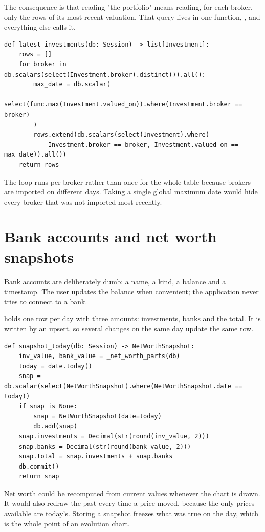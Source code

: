 The consequence is that reading "the portfolio" means reading, for each broker,
only the rows of its most recent valuation. That query lives in one function,
, and everything else calls it.

\begin{lstlisting}[style=py]
def latest_investments(db: Session) -> list[Investment]:
    rows = []
    for broker in db.scalars(select(Investment.broker).distinct()).all():
        max_date = db.scalar(
            select(func.max(Investment.valued_on)).where(Investment.broker == broker)
        )
        rows.extend(db.scalars(select(Investment).where(
            Investment.broker == broker, Investment.valued_on == max_date)).all())
    return rows
\end{lstlisting}

The loop runs per broker rather than once for the whole table because brokers
are imported on different days. Taking a single global maximum date would hide
every broker that was not imported most recently.

\section{Bank accounts and net worth snapshots}

Bank accounts are deliberately dumb: a name, a kind, a balance and a timestamp.
The user updates the balance when convenient; the application never tries to
connect to a bank.

 holds one row per day with three amounts:
investments, banks and the total. It is written by an upsert, so several changes
on the same day update the same row.

\begin{lstlisting}[style=py]
def snapshot_today(db: Session) -> NetWorthSnapshot:
    inv_value, bank_value = _net_worth_parts(db)
    today = date.today()
    snap = db.scalar(select(NetWorthSnapshot).where(NetWorthSnapshot.date == today))
    if snap is None:
        snap = NetWorthSnapshot(date=today)
        db.add(snap)
    snap.investments = Decimal(str(round(inv_value, 2)))
    snap.banks = Decimal(str(round(bank_value, 2)))
    snap.total = snap.investments + snap.banks
    db.commit()
    return snap
\end{lstlisting}

\begin{keypoint}
Net worth could be recomputed from current values whenever the chart is drawn.
It would also redraw the past every time a price moved, because the only prices
available are today's. Storing a snapshot freezes what was true on the day, which
is the whole point of an evolution chart.
\end{keypoint}

